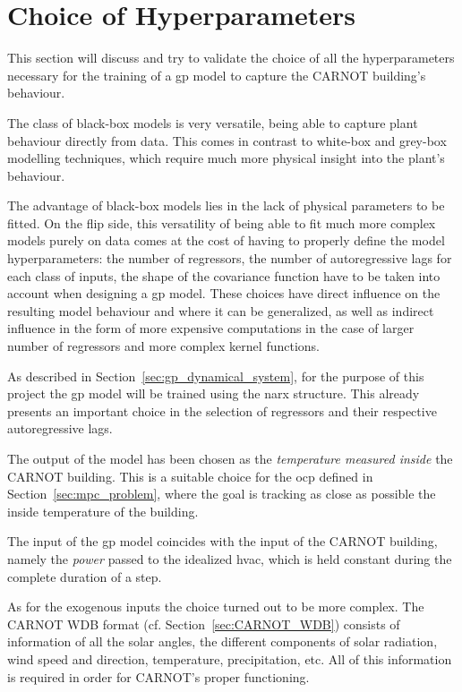 \section{Choice of Hyperparameters}

This section will discuss and try to validate the choice of all the
hyperparameters necessary for the training of a \acrshort{gp} model to capture
the CARNOT building's behaviour.

The class of black-box models is very versatile, being able to capture plant
behaviour directly from data. This comes in contrast to white-box and grey-box
modelling techniques, which require much more physical insight into the plant's
behaviour.

The advantage of black-box models lies in the lack of physical parameters to be
fitted. On the flip side, this versatility of being able to fit much more
complex models purely on data comes at the cost of having to properly define the
model hyperparameters: the number of regressors, the number of autoregressive
lags for each class of inputs, the shape of the covariance function have to be
taken into account when designing a \acrshort{gp} model. These choices have
direct influence on the resulting model behaviour and where it can be
generalized, as well as indirect influence in the form of more expensive
computations in the case of larger number of regressors and more complex kernel
functions.

As described in Section~\ref{sec:gp_dynamical_system}, for the purpose of this
project the \acrlong{gp} model will be trained using the \acrshort{narx}
structure. This already presents an important choice in the selection of
regressors and their respective autoregressive lags.

The output of the model has been chosen as the \textit{temperature measured
inside} the CARNOT building. This is a suitable choice for the \acrshort{ocp}
defined in Section~\ref{sec:mpc_problem}, where the goal is tracking as close as
possible the inside temperature of the building.

The input of the \acrshort{gp} model coincides with the input of the CARNOT
building, namely the \textit{power} passed to the idealized \acrshort{hvac},
which is held constant during the complete duration of a step.

As for the exogenous inputs the choice turned out to be more complex. The CARNOT
WDB format (cf. Section~\ref{sec:CARNOT_WDB}) consists of information of all the
solar angles, the different components of solar radiation, wind speed and
direction, temperature, precipitation, etc. All of this information is required
in order for CARNOT's proper functioning. 

